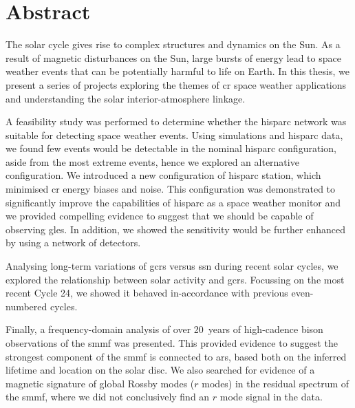 \chapter*{Abstract}

The solar cycle gives rise to complex structures and dynamics on the Sun. As a result of magnetic disturbances on the Sun, large bursts of energy lead to space weather events that can be potentially harmful to life on Earth. In this thesis, we present a series of projects exploring the themes of \gls{cr} space weather applications and understanding the solar interior-atmosphere linkage. 

A feasibility study was performed to determine whether the \gls{hisparc} network was suitable for detecting space weather events. Using simulations and \gls{hisparc} data, we found few events would be detectable in the nominal \gls{hisparc} configuration, aside from the most extreme events, hence we explored an alternative configuration. We introduced a new configuration of \gls{hisparc} station, which minimised \gls{cr} energy biases and noise. This configuration was demonstrated to significantly improve the capabilities of \gls{hisparc} as a space weather monitor and we provided compelling evidence to suggest that we should be capable of observing \glspl{gle}. In addition, we showed the sensitivity would be further enhanced by using a network of detectors.

Analysing long-term variations of \glspl{gcr} versus \gls{ssn} during recent solar cycles, we explored the relationship between solar activity and \glspl{gcr}. Focussing on the most recent Cycle 24, we showed it behaved in-accordance with previous even-numbered cycles.


Finally, a frequency-domain analysis of over 20~years of high-cadence \gls{bison} observations of the \gls{smmf} was presented. This provided evidence to suggest the strongest component of the \gls{smmf} is connected to \glspl{ar}, based both on the inferred lifetime and location on the solar disc. We also searched for evidence of a magnetic signature of global Rossby modes ($r$ modes) in the residual spectrum of the \gls{smmf}, where we did not conclusively find an $r$ mode signal in the data.